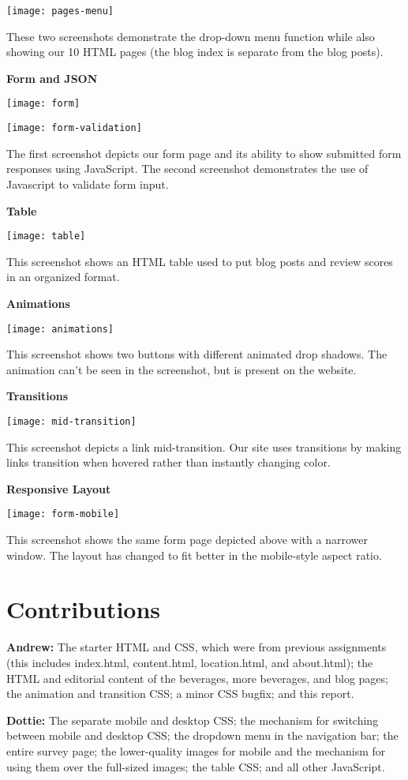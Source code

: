 \documentclass[12pt]{article}
\begin{document}
\texttt{[image: pages-menu]}

These two screenshots demonstrate the drop-down menu function while also
showing our 10 HTML pages (the blog index is separate from the blog posts).

\textbf{Form and JSON}

\texttt{[image: form]}

\texttt{[image: form-validation]}

The first screenshot depicts our form page and its ability to show submitted form responses
using JavaScript. The second screenshot demonstrates the use of Javascript to validate form input.

\textbf{Table}

\texttt{[image: table]}

This screenshot shows an HTML table used to put blog posts and review scores
in an organized format.

\textbf{Animations}

\texttt{[image: animations]}

This screenshot shows two buttons with different animated drop shadows.
The animation can't be seen in the screenshot, but is present on the website.

\textbf{Transitions}

\texttt{[image: mid-transition]}

This screenshot depicts a link mid-transition. Our site uses transitions by
making links transition when hovered rather than instantly changing color.


\textbf{Responsive Layout}

\texttt{[image: form-mobile]}

This screenshot shows the same form page depicted above with a narrower
window. The layout has changed to fit better in the mobile-style
aspect ratio.


\section{Contributions}
\textbf{Andrew:}
The starter HTML and CSS, which were from previous assignments (this includes index.html, content.html, location.html, and about.html); the HTML and editorial content of the beverages, more beverages, and blog pages; the animation and transition CSS; a minor CSS bugfix; and this report.

\textbf{Dottie:}
The separate mobile and desktop CSS; the mechanism for switching between mobile and desktop CSS; the dropdown menu in the navigation bar; the entire survey page; the lower-quality images for mobile and the mechanism for using them over the full-sized images; the table CSS; and all other JavaScript.
\end{document}
